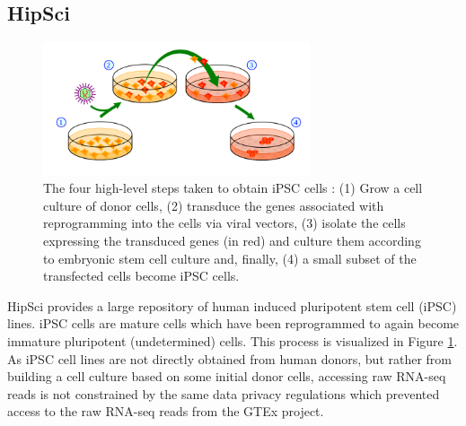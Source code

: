 \subsection{HipSci} \label{subsec:hipsci}
\begin{figure}
	\centering\includegraphics[width=0.7\textwidth]{../visualizations/ch4-methods/ipscprocess.png} 
	\caption[test.]{
		The four high-level steps taken to obtain iPSC cells \cite{img:ipscprocess}:
		(1) Grow a cell culture of donor cells, (2) transduce the genes associated with reprogramming into the cells via viral vectors, (3) isolate the cells expressing the transduced genes (in red) and culture them according to embryonic stem cell culture and, finally, (4) a small subset of the transfected cells become iPSC cells.
	}
	\label{fig:ipscprocess}
\end{figure}

HipSci provides a large repository of human induced pluripotent stem cell (iPSC) lines. iPSC cells are mature cells which have been reprogrammed to again become immature pluripotent (undetermined) cells. This process is visualized in Figure \ref{fig:ipscprocess}. As iPSC cell lines are not directly obtained from human donors, but rather from building a cell culture based on some initial donor cells, accessing raw RNA-seq reads is not constrained by the same data privacy regulations which prevented access to the raw RNA-seq reads from the GTEx project.


